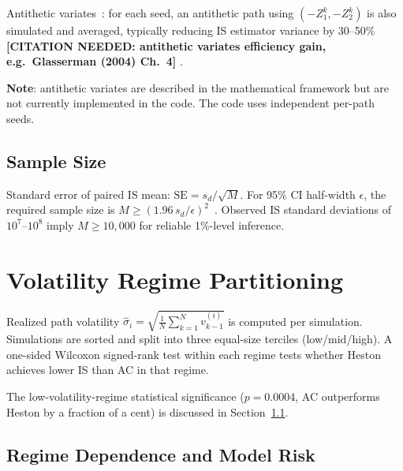 \documentclass[11pt]{article}
\newcommand{\needscite}[1]{%
  {\color{red}\textbf{[CITATION NEEDED: #1]}}%
}
\begin{document}
Antithetic variates~\cite{glasserman2004monte}: for each seed, an antithetic path using
$(-Z_1^k, -Z_2^k)$ is also simulated and averaged, typically reducing IS estimator variance
by 30--50\%~\needscite{antithetic variates efficiency gain, e.g.\ Glasserman (2004) Ch.\ 4}.

\textbf{Note}: antithetic variates are described in the mathematical framework but are not
currently implemented in the code. The code uses independent per-path seeds.

\subsection{Sample Size}

Standard error of paired IS mean: $\mathrm{SE} = s_d/\sqrt{M}$.
For 95\% CI half-width $\epsilon$, the required sample size is
$M \geq (1.96\,s_d/\epsilon)^2$~\cite{glasserman2004monte}.
Observed IS standard deviations of $10^7$--$10^8$ imply $M \geq 10{,}000$ for reliable
1\%-level inference.

\section{Volatility Regime Partitioning}
\label{app:regimes}

Realized path volatility $\hat\sigma_i = \sqrt{\frac{1}{N}\sum_{k=1}^N v_{k-1}^{(i)}}$
is computed per simulation. Simulations are sorted and split into three equal-size terciles
(low/mid/high). A one-sided Wilcoxon signed-rank test within each regime tests whether Heston
achieves lower IS than AC in that regime.

The low-volatility-regime statistical significance ($p=0.0004$, AC outperforms Heston by a
fraction of a cent) is discussed in Section~\ref{app:regimes_disc}.

\subsection{Regime Dependence and Model Risk}
\label{app:regimes_disc}
\end{document}
